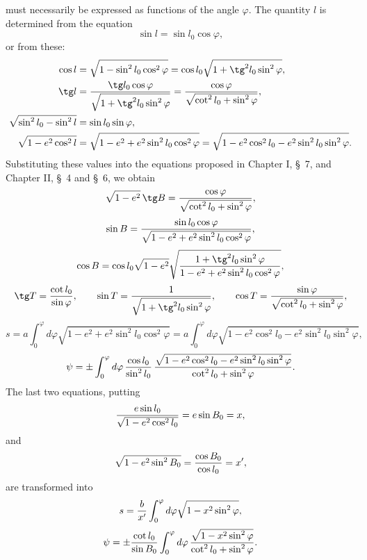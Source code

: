 must necessarily be expressed as functions of the angle $\varphi$. The quantity $l$ is determined from the equation
\[
 \sin l=\sin l_0\cos\varphi,
\]
or from these:
\[
\begin{aligned}
\cos l&=\sqrt{1-\sin^2l_0\cos^2\varphi}=\cos l_0\sqrt{1+\tg^2l_0\sin^2\varphi},\\
\tg l&={\tg l_0\cos\varphi\over\sqrt{1+\tg^2l_0\sin^2\varphi}}
={\cos\varphi\over\sqrt{\cot^2l_0+\sin^2\varphi}},\\
\sqrt{\sin^2l_0-\sin^2l}&=\sin l_0\sin\varphi,\\
\sqrt{1-e^2\cos^2l}&=\sqrt{1-e^2+e^2\sin^2l_0\cos^2\varphi}
=\sqrt{1-e^2\cos^2l_0-e^2\sin^2l_0\sin^2\varphi}.
\end{aligned}
\]
Substituting these values into the equations proposed in Chapter I, \S\ 7, and Chapter II, \S\ 4 and \S\ 6, we obtain
\[
 \sqrt{1-e^2}\,\tg B={\cos\varphi\over\sqrt{\cot^2l_0+\sin^2\varphi}},
\]
\[
 \sin B={\sin l_0\cos\varphi\over\sqrt{1-e^2+e^2\sin^2l_0\cos^2\varphi}},
\]
\[
 \cos B=\cos l_0\sqrt{1-e^2}\sqrt{\frac{1+\tg^2l_0\sin^2\varphi}{1-e^2+e^2\sin^2l_0\cos^2\varphi}},
\]
\[
 \tg T={\cot l_0\over\sin\varphi},\qquad
 \sin T={1\over\sqrt{1+\tg^2l_0\sin^2\varphi}},\qquad
 \cos T={\sin\varphi\over\sqrt{\cot^2l_0+\sin^2\varphi}},
\]
\[
 s=a\int_0^\varphi d\varphi\sqrt{1-e^2+e^2\sin^2l_0\cos^2\varphi}
 =a\int_0^\varphi d\varphi\sqrt{1-e^2\cos^2l_0-e^2\sin^2l_0\sin^2\varphi},
\]
\[
 \psi=\pm\int_0^\varphi d\varphi\,{\cos l_0\over\sin^2l_0}\,
 {\sqrt{1-e^2\cos^2l_0-e^2\sin^2l_0\sin^2\varphi}\over\cot^2l_0+\sin^2\varphi}.
\]
The last two equations, putting
\[
 {e\sin l_0\over\sqrt{1-e^2\cos^2l_0}}=e\sin B_0=x,
\]
and
\[
 \sqrt{1-e^2\sin^2B_0}={\cos B_0\over\cos l_0}=x',
\]
are transformed into
\[
 s={b\over x'}\int_0^\varphi d\varphi\sqrt{1-x^2\sin^2\varphi},
\]
\[
 \psi=\pm{\cot l_0\over\sin B_0}\int_0^\varphi d\varphi\,{\sqrt{1-x^2\sin^2\varphi}\over\cot^2l_0+\sin^2\varphi}.
\]
